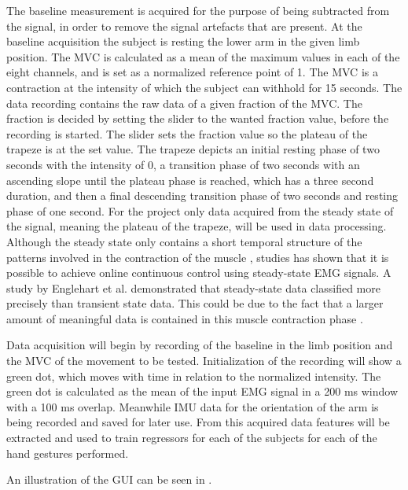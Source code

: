 The baseline measurement is acquired for the purpose of being subtracted from the signal, in order to remove the signal artefacts that are present. At the baseline acquisition the subject is resting the lower arm in the given limb position. The MVC is calculated as a mean of the maximum values in each of the eight channels, and is set as a normalized reference point of 1. The MVC is a contraction at the intensity of which the subject can withhold for 15 seconds. The data recording contains the raw data of a given fraction of the MVC. The fraction is decided by setting the slider to the wanted fraction value, before the recording is started. The slider sets the fraction value so the plateau of the trapeze is at the set value. The trapeze depicts an initial resting phase of two seconds with the intensity of 0, a transition phase of two seconds with an ascending slope until the plateau phase is reached, which has a three second duration, and then a final descending transition phase of two seconds and resting phase of one second. 
For the project only data acquired from the steady state of the signal, meaning the plateau of the trapeze, will be used in data processing. Although the steady state only contains a short temporal structure of the patterns involved in the contraction of the muscle \cite{mobarak2014}, studies has shown that it is possible to achieve online continuous control using steady-state EMG signals. A study by Englehart et al. \cite{englehart2001} demonstrated that steady-state data classified more precisely than transient state data. This could be due to the fact that a larger amount of meaningful data is contained in this muscle contraction phase \cite{mobarakm2014}.

Data acquisition will begin by recording of the baseline in the limb position and the MVC of the movement to be tested. Initialization of the recording will show a green dot, which moves with time in relation to the normalized intensity. The green dot is calculated as the mean of the input EMG signal in a 200 ms window with a 100 ms overlap. Meanwhile IMU data for the orientation of the arm is being recorded and saved for later use. %
From this acquired data features will be extracted and used to train regressors for each of the subjects for each of the hand gestures performed.


An illustration of the GUI can be seen in . 


